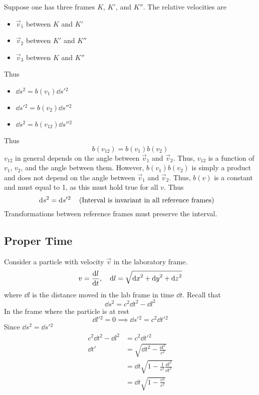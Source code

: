 \documentclass[12pt,a4paper,titlepage]{article}
\begin{document}
Suppose one has three frames $K$, $K'$, and $K''$. The relative velocities are
\begin{itemize}
\item $\vec{v}_{1}$ between $K$ and $K'$
\item $\vec{v}_{2}$ between $K'$ and $K''$
\item $\vec{v}_{3}$ between $K$ and $K''$
\end{itemize}
Thus
\begin{itemize}
\item $\dd{s^{2}}=b(v_{1})\dd{s'{}^{2}}$
\item $\dd{s'{}^{2}}=b(v_{2})\dd{s''{}^{2}}$
\item $\dd{s^{2}}=b(v_{12})\dd{s''{}^{2}}$
\end{itemize}
Thus
\begin{equation}
b(v_{12})=b(v_{1})b(v_{2})
\end{equation}
$v_{12}$ in general depends on the angle between $\vec{v}_{1}$ and $\vec{v}_{2}$. Thus, $v_{12}$ is a function of $v_{1}$, $v_{2}$, and the angle between them. However, $b(v_{1})b(v_{2})$ is simply a product and does not depend on the angle between $\vec{v}_{1}$ and $\vec{v}_{2}$. Thus, $b(v)$ is a constant and must equal to 1, as this must hold true for all $v$. Thus
\begin{equation}
\dd{s^{2}}=\dd{s'{}^{2}}\qq{(Interval is invariant in all reference frames)}
\end{equation}
Transformations between reference frames must preserve the interval.

\subsection{Proper Time}
Consider a particle with velocity $\vec{v}$ in the laboratory frame.
\begin{equation}
v=\dv{l}{t},\quad\dd{l}=\sqrt{\dd{x}^{2}+\dd{y}^{2}+\dd{z}^{2}}
\end{equation}
where $\dd{l}$ is the distance moved in the lab frame in time $\dd{t}$. Recall that
\begin{equation}
\dd{s}^{2}=c^{2}\dd{t}^{2}-\dd{l}^{2}
\end{equation}
In the frame where the particle is at rest
\begin{equation}
\dd{l'{}^{2}}=0\implies \dd{s'{}^{2}}=c^{2}\dd{t'{}^{2}}
\end{equation}
Since $\dd{s^{2}}=\dd{s'{}^{2}}$
\begin{equation}
\begin{aligned}
c^{2}\dd{t^{2}}-\dd{l^{2}}&=c^{2}\dd{t'{}^{2}}\\
\dd{t'}&=\sqrt{\dd{t^{2}}-\frac{\dd{l^{2}}}{c^{2}}}\\
&=\dd{t}\sqrt{1-\frac{1}{c^{2}}\frac{\dd{l^{2}}}{\dd{t^{2}}}}\\
&=\dd{t}\sqrt{1-\frac{v^{2}}{c^{2}}}
\end{aligned}
\end{equation}
\end{document}
